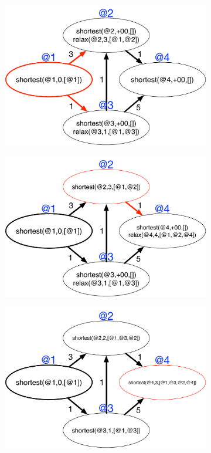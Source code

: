 \begin{figure}
\begin{center}
   \begin{subfigure}[b]{0.4\textwidth}
      \includegraphics[width=\textwidth]{figures/sssp/shortest2}
   \end{subfigure}
   \begin{subfigure}[b]{0.4\textwidth}
      \includegraphics[width=\textwidth]{figures/sssp/shortest3}
   \end{subfigure}
   \begin{subfigure}[b]{0.4\textwidth}
      \includegraphics[width=\textwidth]{figures/sssp/shortest8}

\end{subfigure}
\end{center}
\end{figure}
